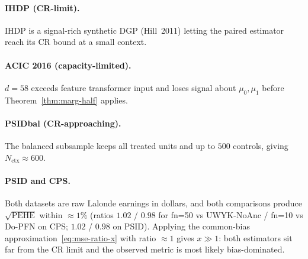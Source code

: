 \documentclass[11pt]{article}
\theoremstyle{remark}
\begin{document}

\paragraph{IHDP (CR-limit).}  IHDP is a signal-rich synthetic DGP (Hill~2011) letting the paired
estimator reach its CR bound at a small context. 

\paragraph{ACIC 2016 (capacity-limited).} $d = 58$ exceeds feature transformer input and
loses signal about $\mu_0, \mu_1$ before Theorem~\ref{thm:marg-half}
applies.  

\paragraph{PSIDbal (CR-approaching).} The balanced subsample keeps
all treated units and up to $500$ controls, giving $N_{\mathrm{ctx}}
\approx 600$. 

\paragraph{PSID and CPS.} Both datasets are raw Lalonde earnings in
dollars, and both comparisons produce $\sqrt{\mathrm{PEHE}}$ within
$\approx 1\%$ (ratios $1.02$ / $0.98$ for fn=50 vs UWYK-NoAnc / fn=10
vs Do-PFN on CPS; $1.02$ / $0.98$ on PSID). Applying the common-bias approximation~\eqref{eq:mse-ratio-x} with ratio
$\approx 1$ gives $x \gg 1$: both estimators sit far from the CR
limit and the observed metric is most likely bias-dominated. 
\end{document}
